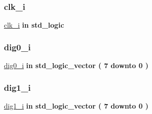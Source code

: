 \subsubsection{\texorpdfstring{clk\+\_\+i}{clk\_i}}
{\footnotesize\ttfamily \hyperlink{classio__ctrl_abe949478e3f8aad0a6aeb1842fa6c608}{clk\+\_\+i} {\bfseries \textcolor{keywordflow}{in}\textcolor{vhdlchar}{ }} {\bfseries \textcolor{comment}{std\+\_\+logic}\textcolor{vhdlchar}{ }} \hspace{0.3cm}{\ttfamily [Port]}}

\mbox{\label{classio__ctrl_a32bd80898d1d7c2a543b82a1d6ad1e6c}} 
\subsubsection{\texorpdfstring{dig0\+\_\+i}{dig0\_i}}
{\footnotesize\ttfamily \hyperlink{classio__ctrl_a32bd80898d1d7c2a543b82a1d6ad1e6c}{dig0\+\_\+i} {\bfseries \textcolor{keywordflow}{in}\textcolor{vhdlchar}{ }} {\bfseries \textcolor{comment}{std\+\_\+logic\+\_\+vector}\textcolor{vhdlchar}{ }\textcolor{vhdlchar}{(}\textcolor{vhdlchar}{ }\textcolor{vhdlchar}{ } \textcolor{vhdldigit}{7} \textcolor{vhdlchar}{ }\textcolor{keywordflow}{downto}\textcolor{vhdlchar}{ }\textcolor{vhdlchar}{ } \textcolor{vhdldigit}{0} \textcolor{vhdlchar}{ }\textcolor{vhdlchar}{)}\textcolor{vhdlchar}{ }} \hspace{0.3cm}{\ttfamily [Port]}}

\mbox{\label{classio__ctrl_a5038eac0f38fc173af3ff10434e90921}} 
\subsubsection{\texorpdfstring{dig1\+\_\+i}{dig1\_i}}
{\footnotesize\ttfamily \hyperlink{classio__ctrl_a5038eac0f38fc173af3ff10434e90921}{dig1\+\_\+i} {\bfseries \textcolor{keywordflow}{in}\textcolor{vhdlchar}{ }} {\bfseries \textcolor{comment}{std\+\_\+logic\+\_\+vector}\textcolor{vhdlchar}{ }\textcolor{vhdlchar}{(}\textcolor{vhdlchar}{ }\textcolor{vhdlchar}{ } \textcolor{vhdldigit}{7} \textcolor{vhdlchar}{ }\textcolor{keywordflow}{downto}\textcolor{vhdlchar}{ }\textcolor{vhdlchar}{ } \textcolor{vhdldigit}{0} \textcolor{vhdlchar}{ }\textcolor{vhdlchar}{)}\textcolor{vhdlchar}{ }} \hspace{0.3cm}{\ttfamily [Port]}}

